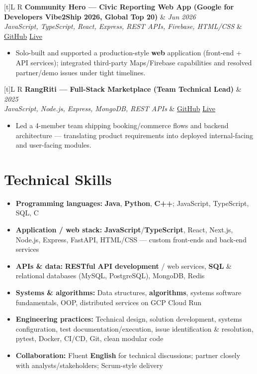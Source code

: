 \documentclass[a4paper,10pt]{article}
\newcommand{\resumeProject}[4]{%
  \vspace{0.4mm}
  \noindent
  \begin{tabularx}{\textwidth}[t]{L R}
    \textbf{#1} & \textit{#3} \\
    \textit{#2} & #4 \\
  \end{tabularx}
  \vspace{-0.3mm}%
}
\begin{document}
\resumeProject
  {Community Hero --- Civic Reporting Web App (Google for Developers Vibe2Ship 2026, Global Top 20)}
  {JavaScript, TypeScript, React, Express, REST APIs, Firebase, HTML/CSS}
  {Jun 2026}
  {\href{https://github.com/Ojas-Srivastava05/community-hero}{GitHub} \textbar{} \href{https://community-hero-eight.vercel.app}{Live}}
\begin{itemize}
  \item Solo-built and supported a production-style \textbf{web} application (front-end + API services); integrated third-party Maps/Firebase capabilities and resolved partner/demo issues under tight timelines.
\end{itemize}

\resumeProject
  {RangRiti --- Full-Stack Marketplace (Team Technical Lead)}
  {JavaScript, Node.js, Express, MongoDB, REST APIs}
  {2025}
  {\href{https://github.com/Ojas-Srivastava05/RangRiti}{GitHub} \textbar{} \href{https://rangriti.onrender.com/}{Live}}
\begin{itemize}
  \item Led a 4-member team shipping booking/commerce flows and backend architecture --- translating product requirements into deployed internal-facing and user-facing modules.
\end{itemize}

\section{Technical Skills}
\small
\begin{itemize}[label={}]
  \item \textbf{Programming languages:} \textbf{Java}, \textbf{Python}, \textbf{C++}; JavaScript, TypeScript, SQL, C
  \item \textbf{Application / web stack:} \textbf{JavaScript}/\textbf{TypeScript}, React, Next.js, Node.js, Express, FastAPI, HTML/CSS --- custom front-ends and back-end services
  \item \textbf{APIs \& data:} \textbf{RESTful} \textbf{API development} / web services, \textbf{SQL} \& relational databases (MySQL, PostgreSQL), MongoDB, Redis
  \item \textbf{Systems \& algorithms:} Data structures, \textbf{algorithms}, systems software fundamentals, OOP, distributed services on GCP Cloud Run
  \item \textbf{Engineering practices:} Technical design, solution development, systems configuration, test documentation/execution, issue identification \& resolution, pytest, Docker, CI/CD, Git, clean modular code
  \item \textbf{Collaboration:} Fluent \textbf{English} for technical discussions; partner closely with analysts/stakeholders; Scrum-style delivery
\end{itemize}
\end{document}

